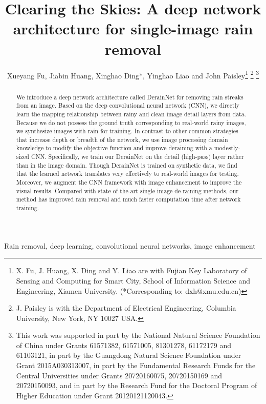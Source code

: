 \documentclass[journal]{IEEEtran}
\begin{document}
\title{Clearing the Skies: A deep network architecture for single-image rain removal}


\author{Xueyang Fu, Jiabin Huang, Xinghao Ding*, Yinghao Liao and John Paisley\thanks{X. Fu, J. Huang, X. Ding and Y. Liao are with Fujian Key Laboratory of Sensing and Computing for Smart City, School of Information Science and Engineering, Xiamen University. (*Corresponding to: dxh@xmu.edu.cn)}
\thanks{J. Paisley is with the Department of Electrical Engineering, Columbia University, New York, NY 10027 USA.}
\thanks{This work was supported in part by the National Natural Science Foundation of China under Grants 61571382, 61571005, 81301278, 61172179 and 61103121, in part by the Guangdong Natural Science Foundation under Grant 2015A030313007, in part by the Fundamental Research Funds for the Central Universities under Grants 20720160075, 20720150169 and 20720150093, and in part by the Research Fund for the Doctoral Program of Higher Education under Grant 20120121120043.}
}


\maketitle


\begin{abstract}
We introduce a deep network architecture called DerainNet for removing rain streaks from an image. Based on the deep convolutional neural network (CNN), we directly learn the mapping relationship between rainy and clean image detail layers from data. Because we do not possess the ground truth corresponding to real-world rainy images, we synthesize images with rain for training. In contrast to other common strategies that increase depth or breadth of the network, we use image processing domain knowledge to modify the objective function and improve deraining with a modestly-sized CNN. Specifically, we train our DerainNet on the detail (high-pass) layer rather than in the image domain. Though DerainNet is trained on synthetic data, we find that the learned network translates very effectively to real-world images for testing. Moreover, we augment the CNN framework with image enhancement to improve the visual results. Compared with state-of-the-art single image de-raining methods, our method has improved rain 
removal and much faster computation time after network training.
\end{abstract}


\begin{IEEEkeywords}
Rain removal, deep learning, convolutional neural networks, image enhancement
\end{IEEEkeywords}
\end{document}
